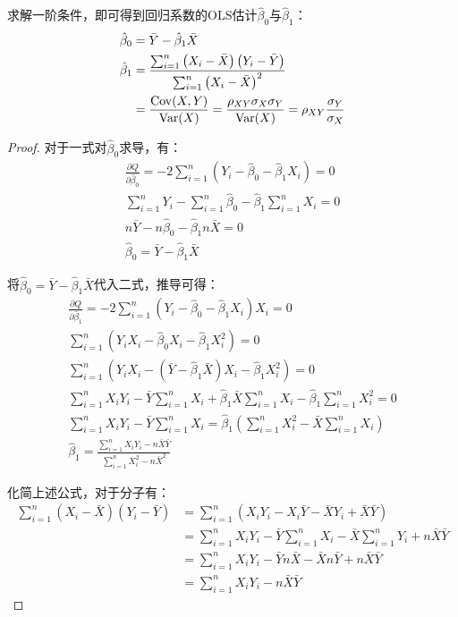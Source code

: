 \documentclass[11pt]{article}
\begin{document}
求解一阶条件，即可得到回归系数的OLS估计$\hat{\beta}_0$与$\hat{\beta}_1$：
\begin{align*}
    \hat{\beta}_0 &= \bar{Y} - \hat{\beta}_1 \bar{X} \\
    \hat{\beta}_1 &= \frac{\sum_{i=1}^{n} \left(X_i - \bar{X}\right) \left(Y_i - \bar{Y}\right)}{\sum_{i=1}^{n} \left(X_i - \bar{X}\right)^2} \\
    &= \frac{\operatorname{Cov}(X,Y)}{\operatorname{Var}(X)} = \frac{\rho_{XY} \sigma_X \sigma_Y}{\operatorname{Var}(X)} = \rho_{XY} \frac{\sigma_Y}{\sigma_X}
\end{align*}

\begin{proof}
对于一式对$\hat{\beta}_0$求导，有：
\begin{gather*}
    \frac{\partial Q}{\partial \hat{\beta}_0} = -2 \sum_{i=1}^{n} \left( Y_i - \hat{\beta}_0 - \hat{\beta}_1 X_i \right) = 0 \\
    \sum_{i=1}^{n} Y_i - \sum_{i=1}^{n} \hat{\beta}_0 - \hat{\beta}_1 \sum_{i=1}^{n} X_i = 0 \\
    n \bar{Y} - n \hat{\beta}_0  - \hat{\beta}_1 n \bar{X} = 0 \\
    \hat{\beta}_0 = \bar{Y} - \hat{\beta}_1 \bar{X}
\end{gather*}

将$\hat{\beta}_0 = \bar{Y} - \hat{\beta}_1 \bar{X}$代入二式，推导可得：
\begin{gather*}
    \frac{\partial Q}{\partial \hat{\beta}_1} = -2 \sum_{i=1}^{n} \left( Y_i - \hat{\beta}_0 - \hat{\beta}_1 X_i \right) X_i = 0 \\
    \sum_{i=1}^{n} \left( Y_i X_i - \hat{\beta}_0 X_i - \hat{\beta}_1 X_i^2 \right) = 0 \\
    \sum_{i=1}^{n} \left( Y_i X_i - (\bar{Y} - \hat{\beta}_1 \bar{X}) X_i - \hat{\beta}_1 X_i^2 \right) = 0 \\
    \sum_{i=1}^{n} X_i Y_i - \bar{Y} \sum_{i=1}^{n} X_i + \hat{\beta}_1 \bar{X} \sum_{i=1}^{n} X_i - \hat{\beta}_1 \sum_{i=1}^{n} X_i^2 = 0 \\
    \sum_{i=1}^{n} X_i Y_i - \bar{Y} \sum_{i=1}^{n} X_i = \hat{\beta}_1 \left( \sum_{i=1}^{n} X_i^2 - \bar{X} \sum_{i=1}^{n} X_i \right) \\
    \hat{\beta}_1 = \frac{\sum_{i=1}^{n} X_i Y_i - n \bar{X} \bar{Y}}{\sum_{i=1}^{n} X_i^2 - n \bar{X}^2}
\end{gather*}

化简上述公式，对于分子有：
\begin{align*}
    \sum_{i=1}^{n} \left(X_i - \bar{X}\right) \left(Y_i - \bar{Y}\right)
    &= \sum_{i=1}^{n} \left( X_i Y_i - X_i\bar{Y} - \bar{X}Y_i + \bar{X}\bar{Y} \right) \\
    &=\sum_{i=1}^{n} X_i Y_i - \bar{Y} \sum_{i=1}^{n} X_i - \bar{X} \sum_{i=1}^{n} Y_i + n\bar{X}\bar{Y} \\
    &=\sum_{i=1}^{n} X_i Y_i - \bar{Y} n \bar{X} - \bar{X} n \bar{Y} + n\bar{X}\bar{Y} \\
    &=\sum_{i=1}^{n} X_i Y_i - n\bar{X}\bar{Y}
\end{align*}


\end{proof}
\end{document}
